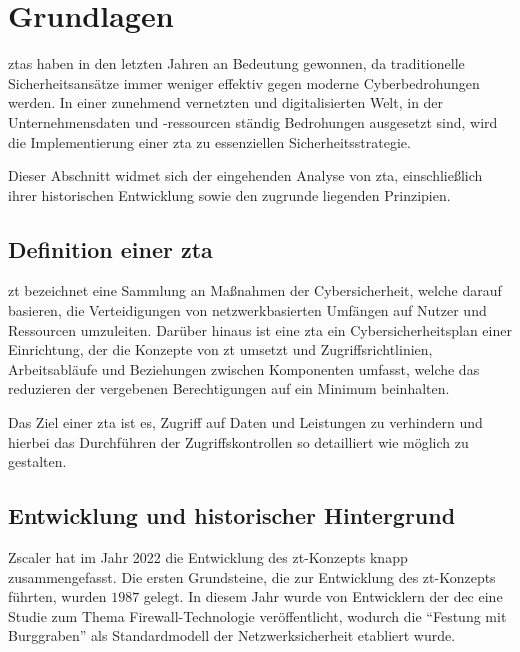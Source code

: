 \newpage


\section{Grundlagen}\label{sec:grundlagen}
\acp{zta} haben in den letzten Jahren an Bedeutung gewonnen, da traditionelle Sicherheitsansätze immer weniger effektiv gegen moderne Cyberbedrohungen werden.
In einer zunehmend vernetzten und digitalisierten Welt, in der Unternehmensdaten und -ressourcen ständig Bedrohungen ausgesetzt sind, wird die Implementierung einer \ac{zta} zu essenziellen Sicherheitsstrategie.

Dieser Abschnitt widmet sich der eingehenden Analyse von \ac{zta}, einschließlich ihrer historischen Entwicklung sowie den zugrunde liegenden Prinzipien.

\subsection[Definition einer Zero-Trust-Architektur]{Definition einer \ac{zta}}\label{subsec:definition-einer-zta}
\ac{zt} bezeichnet eine Sammlung an Maßnahmen der Cybersicherheit, welche darauf basieren, die Verteidigungen von netzwerkbasierten Umfängen auf Nutzer und Ressourcen umzuleiten\autocite[\vglf][]{NIST:800207}.
Darüber hinaus ist eine \ac{zta} ein Cybersicherheitsplan einer Einrichtung, der die Konzepte von \ac{zt} umsetzt und Zugriffsrichtlinien, Arbeitsabläufe und Beziehungen zwischen Komponenten umfasst\autocite[\vglf][]{NIST:800207}, welche das reduzieren der vergebenen Berechtigungen auf ein Minimum beinhalten.

Das Ziel einer \ac{zta} ist es,  Zugriff auf Daten und Leistungen zu verhindern und hierbei das Durchführen der Zugriffskontrollen so detailliert wie möglich zu gestalten.


\subsection{Entwicklung und historischer Hintergrund}\label{subsec:entwicklung-und-historischer-hintergrund}
Zscaler hat im Jahr 2022 die Entwicklung des \ac{zt}-Konzepts knapp zusammengefasst.\autocites[\vglf][]{zscaler-2022b}
Die ersten Grundsteine, die zur Entwicklung des \ac{zt}-Konzepts führten, wurden $1987$ gelegt.
In diesem Jahr wurde von Entwicklern der \ac{dec} eine Studie zum Thema Firewall-Technologie veröffentlicht, wodurch die \enquote{Festung mit Burggraben} als Standardmodell der Netzwerksicherheit etabliert wurde.\autocites[\vglf][]{zscaler-2022b}

